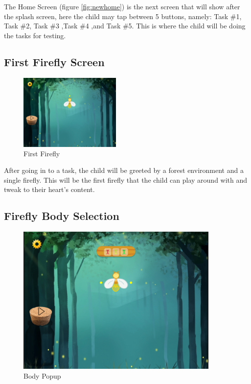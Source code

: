The Home Screen (figure \ref{fig:newhome}) is the next screen that will show after the splash screen, here the child may tap between 5 buttons, namely: Task \#1, Task \#2, Task \#3 ,Task \#4 ,and Task \#5. This is where the child will be doing the tasks for testing.

\subsection{First Firefly Screen}

\begin{figure}[H]
    \centering
    \includegraphics[width=5cm]{figures/newScreenFlows/newfirstfirefly.png}
    \caption{First Firefly}
    \label{fig:firstfly}
\end{figure}

After going in to a task, the child will be greeted by a forest environment and a single firefly.
This will be the first firefly that the child can play around with and tweak to their heart's content.

\subsection{Firefly Body Selection}

\begin{figure}[H]
    \centering
    \includegraphics[width=10cm]{figures/newScreenFlows/newbody.png}
    \caption{Body Popup}
    \label{fig:newbody}
\end{figure}

